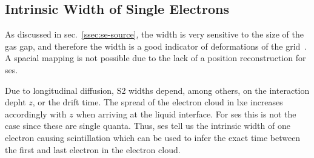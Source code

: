 
\FloatBarrier
\subsection{Intrinsic Width of Single Electrons}
\label{ssec:width}
\FloatBarrier


As discussed in sec.~\ref{ssec:se-source}, the width is very sensitive to the size of the gas gap, and therefore the width is a good indicator of deformations of the grid~\cite{?}.
A spacial mapping is not possible due to the lack of a position reconstruction for \glspl{se}.

Due to longitudinal diffusion, S2 widths depend, among others, on the interaction depht $ z $, or the drift time.
The spread of the electron cloud in \gls{lxe} increases accordingly with $ z $ when arriving at the liquid interface.
For \glspl{se} this is not the case since these are single quanta.
Thus, \glspl{se} tell us the intrinsic width of one electron causing scintillation which can be used to infer the exact time between the first and last electron in the electron cloud.



